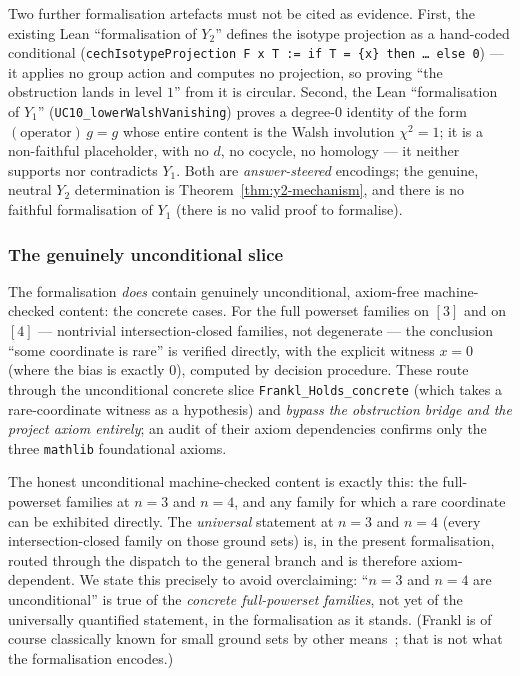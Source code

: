 Two further formalisation artefacts must not be cited as evidence.
First, the existing Lean ``formalisation of $Y_2$'' defines the
isotype projection as a hand-coded conditional
(\texttt{cechIsotypeProjection F x T := if T = \{x\} then \dots\ else 0})
--- it applies no group action and computes no projection, so proving
``the obstruction lands in level $1$'' from it is circular. Second, the
Lean ``formalisation of $Y_1$'' (\texttt{UC10\_lowerWalshVanishing})
proves a degree-$0$ identity of the form $(\text{operator})\,g=g$ whose
entire content is the Walsh involution $\chi^2=1$; it is a non-faithful
placeholder, with no $d$, no cocycle, no homology --- it neither
supports nor contradicts $Y_1$. Both are \emph{answer-steered}
encodings; the genuine, neutral $Y_2$ determination is
Theorem~\ref{thm:y2-mechanism}, and there is no faithful formalisation
of $Y_1$ (there is no valid proof to formalise).

\subsubsection{The genuinely unconditional slice}
\label{ssec:lean-unconditional}

The formalisation \emph{does} contain genuinely unconditional,
axiom-free machine-checked content: the concrete cases. For the full
powerset families on $[3]$ and on $[4]$ --- nontrivial
intersection-closed families, not degenerate --- the conclusion
``some coordinate is rare'' is verified directly, with the explicit
witness $x=0$ (where the bias is exactly $0$), computed by
decision procedure. These route through the unconditional concrete
slice \texttt{Frankl\_Holds\_concrete} (which takes a rare-coordinate
witness as a hypothesis) and \emph{bypass the obstruction bridge and
the project axiom entirely}; an audit of their axiom dependencies
confirms only the three \texttt{mathlib} foundational axioms.

\begin{status}
The honest unconditional machine-checked content is exactly this: the
full-powerset families at $n=3$ and $n=4$, and any family for which a
rare coordinate can be exhibited directly. The \emph{universal}
statement at $n=3$ and $n=4$ (every intersection-closed family on those
ground sets) is, in the present formalisation, routed through the
dispatch to the general branch and is therefore axiom-dependent. We
state this precisely to avoid overclaiming: ``$n=3$ and $n=4$ are
unconditional'' is true of the \emph{concrete full-powerset families},
not yet of the universally quantified statement, in the formalisation
as it stands. (Frankl is of course classically known for small ground
sets by other means~\cite{bruhn-schaudt}; that is not what the
formalisation encodes.)
\end{status}
